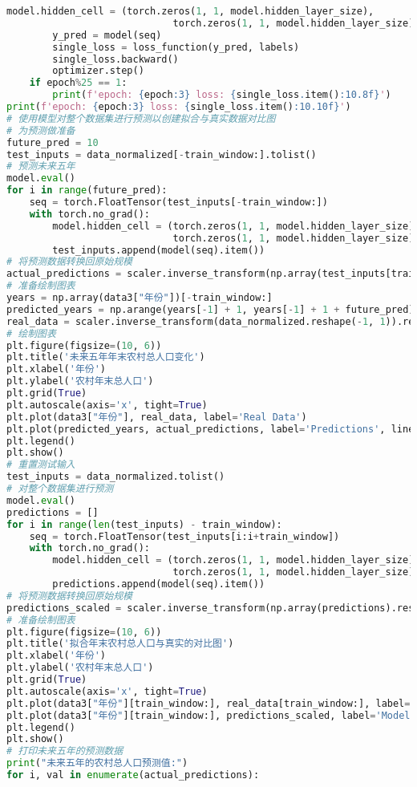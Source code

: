 \begin{lstlisting}[language=python,caption={城乡人口}]
        model.hidden_cell = (torch.zeros(1, 1, model.hidden_layer_size),
                             torch.zeros(1, 1, model.hidden_layer_size))
        y_pred = model(seq)
        single_loss = loss_function(y_pred, labels)
        single_loss.backward()
        optimizer.step()
    if epoch%25 == 1:
        print(f'epoch: {epoch:3} loss: {single_loss.item():10.8f}')
print(f'epoch: {epoch:3} loss: {single_loss.item():10.10f}')
# 使用模型对整个数据集进行预测以创建拟合与真实数据对比图
# 为预测做准备
future_pred = 10
test_inputs = data_normalized[-train_window:].tolist()
# 预测未来五年
model.eval()
for i in range(future_pred):
    seq = torch.FloatTensor(test_inputs[-train_window:])
    with torch.no_grad():
        model.hidden_cell = (torch.zeros(1, 1, model.hidden_layer_size),
                             torch.zeros(1, 1, model.hidden_layer_size))
        test_inputs.append(model(seq).item())
# 将预测数据转换回原始规模
actual_predictions = scaler.inverse_transform(np.array(test_inputs[train_window:] ).reshape(-1, 1))
# 准备绘制图表
years = np.array(data3["年份"])[-train_window:]
predicted_years = np.arange(years[-1] + 1, years[-1] + 1 + future_pred)
real_data = scaler.inverse_transform(data_normalized.reshape(-1, 1)).reshape(-1)
# 绘制图表
plt.figure(figsize=(10, 6))
plt.title('未来五年年末农村总人口变化')
plt.xlabel('年份')
plt.ylabel('农村年末总人口')
plt.grid(True)
plt.autoscale(axis='x', tight=True)
plt.plot(data3["年份"], real_data, label='Real Data')
plt.plot(predicted_years, actual_predictions, label='Predictions', linestyle='--')
plt.legend()
plt.show()
# 重置测试输入
test_inputs = data_normalized.tolist()
# 对整个数据集进行预测
model.eval()
predictions = []
for i in range(len(test_inputs) - train_window):
    seq = torch.FloatTensor(test_inputs[i:i+train_window])
    with torch.no_grad():
        model.hidden_cell = (torch.zeros(1, 1, model.hidden_layer_size),
                             torch.zeros(1, 1, model.hidden_layer_size))
        predictions.append(model(seq).item())
# 将预测数据转换回原始规模
predictions_scaled = scaler.inverse_transform(np.array(predictions).reshape(-1, 1))
# 准备绘制图表
plt.figure(figsize=(10, 6))
plt.title('拟合年末农村总人口与真实的对比图')
plt.xlabel('年份')
plt.ylabel('农村年末总人口')
plt.grid(True)
plt.autoscale(axis='x', tight=True)
plt.plot(data3["年份"][train_window:], real_data[train_window:], label='Real Data')
plt.plot(data3["年份"][train_window:], predictions_scaled, label='Model Fit', linestyle='--')
plt.legend()
plt.show()
# 打印未来五年的预测数据
print("未来五年的农村总人口预测值:")
for i, val in enumerate(actual_predictions):

\end{lstlisting}
